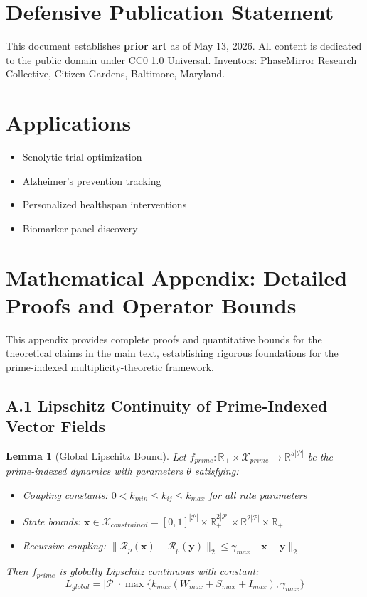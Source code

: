 \documentclass[11pt,letterpaper]{article}
\newtheorem{lemma}[theorem]{Lemma}
\begin{document}
\section{Defensive Publication Statement}

This document establishes \textbf{prior art} as of May 13, 2026. All content is dedicated to the public domain under CC0 1.0 Universal. Inventors: PhaseMirror Research Collective, Citizen Gardens, Baltimore, Maryland.

\section{Applications}

\begin{itemize}
\item Senolytic trial optimization
\item Alzheimer's prevention tracking
\item Personalized healthspan interventions
\item Biomarker panel discovery
\end{itemize}

\section*{Mathematical Appendix: Detailed Proofs and Operator Bounds}

This appendix provides complete proofs and quantitative bounds for the theoretical claims in the main text, establishing rigorous foundations for the prime-indexed multiplicity-theoretic framework.

\subsection*{A.1 Lipschitz Continuity of Prime-Indexed Vector Fields}

\begin{lemma}[Global Lipschitz Bound]
Let $f_{prime}: \mathbb{R}_+ \times \mathcal{X}_{prime} \to \mathbb{R}^{5|\mathcal{P}|}$ be the prime-indexed dynamics with parameters $\theta$ satisfying:
\begin{itemize}
\item Coupling constants: $0 < k_{min} \leq k_{ij} \leq k_{max}$ for all rate parameters
\item State bounds: $\mathbf{x} \in \mathcal{X}_{constrained} = [0,1]^{|\mathcal{P}|} \times \mathbb{R}_+^{2|\mathcal{P}|} \times \mathbb{R}^{2|\mathcal{P}|} \times \mathbb{R}_+$
\item Recursive coupling: $\|\mathcal{R}_p(\mathbf{x}) - \mathcal{R}_p(\mathbf{y})\|_2 \leq \gamma_{max} \|\mathbf{x} - \mathbf{y}\|_2$
\end{itemize}
Then $f_{prime}$ is globally Lipschitz continuous with constant:
\[
L_{global} = |\mathcal{P}| \cdot \max\{k_{max} (W_{max} + S_{max} + I_{max}), \gamma_{max}\}
\]
\end{lemma}
\end{document}
